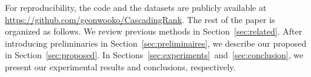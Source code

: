 \def\UrlFont{\ttfamily}
For reproducibility, the code and the datasets are publicly available
at \url{https://github.com/geonwooko/CascadingRank}.
The rest of the paper is organized as follows. 
We review previous methods in Section~\ref{sec:related}.
After introducing preliminaries in Section~\ref{sec:preliminaires}, we describe our proposed \method in Section~\ref{sec:proposed}.
In Sections~\ref{sec:experiments}~and~\ref{sec:conclusion}, we present our experimental results and conclusions, respectively.

